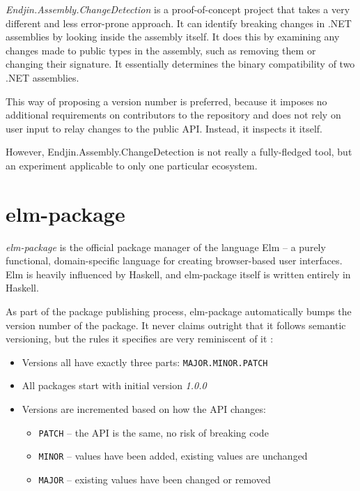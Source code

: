 \documentclass{l4proj}
\newcommand\genericstyle{\lstset{basicstyle=\ttm}}
\newcommand\codeinline[1]{{\genericstyle\lstinline!#1!}}
\begin{document}
\textit{Endjin.Assembly.ChangeDetection} \cite{Endjin} is a
proof-of-concept project that takes a very different and less
error-prone approach. It can identify breaking changes in .NET
assemblies by looking inside the assembly itself. It does this
by examining any changes made to public types in the assembly, such as
removing them or changing their signature. It essentially determines
the binary compatibility of two .NET assemblies.

This way of proposing a version number is preferred, because it
imposes no additional requirements on contributors to the repository
and does not rely on user input to relay changes to the public API.
Instead, it inspects it itself.

However, Endjin.Assembly.ChangeDetection is not really a fully-fledged
tool, but an experiment applicable to only one particular ecosystem.

\section{elm-package}

\textit{elm-package} \cite{ElmPackage} is the official package manager
of the language Elm -- a purely functional, domain-specific
language for creating browser-based user interfaces. Elm is heavily
influenced by Haskell, and elm-package itself is written entirely in
Haskell.

As part of the package publishing process, elm-package automatically
bumps the version number of the package. It never claims outright that
it follows semantic versioning, but the rules it specifies are very
reminiscent of it \cite{ElmPackageVR}:

\begin{itemize}
\item Versions all have exactly three parts: \codeinline{MAJOR.MINOR.PATCH}
\item All packages start with initial version \textit{1.0.0}
\item Versions are incremented based on how the API changes:
\begin{itemize}
\item \codeinline{PATCH} -- the API is the same, no risk of breaking code
\item \codeinline{MINOR} -- values have been added, existing values are unchanged
\item \codeinline{MAJOR} -- existing values have been changed or removed
\end{itemize}
\end{itemize}
\end{document}

